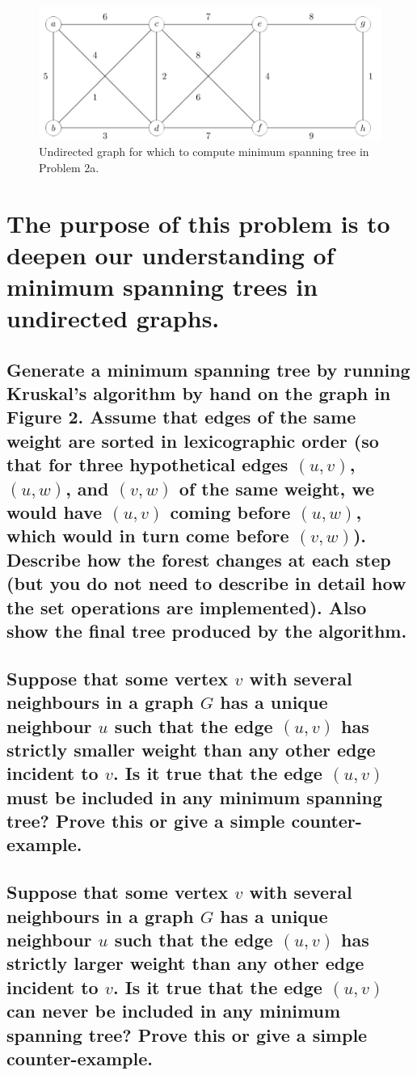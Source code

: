 \documentclass[a4paper,12pt]{article}
\begin{document}
\begin{figure}[H]
    \centering
    \includegraphics[width=1\textwidth]{2.png}
    \caption{Undirected graph for which to compute minimum spanning tree in Problem 2a.}
\end{figure}
\section[Question 2]{The purpose of this problem is to deepen our understanding of minimum spanning trees in undirected graphs.}
\subsection{Generate a minimum spanning tree by running Kruskal's algorithm by hand on the graph in Figure 2. Assume that edges of the same weight are sorted in lexicographic order (so that for three hypothetical edges $(u, v)$, $(u, w)$, and $(v, w)$ of the same weight, we would have $(u, v)$ coming before $(u, w)$, which would in turn come before $(v, w)$). Describe how the forest changes at each step (but you do not need to describe in detail how the set operations are implemented). Also show the final tree produced by the algorithm.}



\subsection{Suppose that some vertex $v$ with several neighbours in a graph $G$ has a unique neighbour $u$ such that the edge $(u, v)$ has strictly smaller weight than any other edge incident to $v$. Is it true that the edge $(u, v)$ must be included in any minimum spanning tree? Prove this or give a simple counter-example.}



\subsection{Suppose that some vertex $v$ with several neighbours in a graph $G$ has a unique neighbour $u$ such that the edge $(u, v)$ has strictly larger weight than any other edge incident to $v$. Is it true that the edge $(u, v)$ can never be included in any minimum spanning tree? Prove this or give a simple counter-example.}
\end{document}
